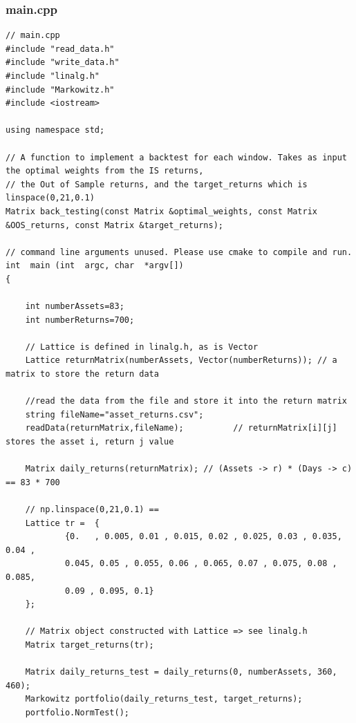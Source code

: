 \documentclass[12pt,twoside]{article}
\begin{document}
\subsubsection{main.cpp}
\scriptsize
\begin{verbatim}
// main.cpp
#include "read_data.h"
#include "write_data.h"
#include "linalg.h"
#include "Markowitz.h"
#include <iostream>

using namespace std;

// A function to implement a backtest for each window. Takes as input the optimal weights from the IS returns,
// the Out of Sample returns, and the target_returns which is linspace(0,21,0.1)
Matrix back_testing(const Matrix &optimal_weights, const Matrix &OOS_returns, const Matrix &target_returns);

// command line arguments unused. Please use cmake to compile and run.
int  main (int  argc, char  *argv[])
{

    int numberAssets=83;
    int numberReturns=700;

    // Lattice is defined in linalg.h, as is Vector
    Lattice returnMatrix(numberAssets, Vector(numberReturns)); // a matrix to store the return data

    //read the data from the file and store it into the return matrix
    string fileName="asset_returns.csv";
    readData(returnMatrix,fileName);          // returnMatrix[i][j] stores the asset i, return j value

    Matrix daily_returns(returnMatrix); // (Assets -> r) * (Days -> c) == 83 * 700

    // np.linspace(0,21,0.1) ==
    Lattice tr =  {
            {0.   , 0.005, 0.01 , 0.015, 0.02 , 0.025, 0.03 , 0.035, 0.04 ,
            0.045, 0.05 , 0.055, 0.06 , 0.065, 0.07 , 0.075, 0.08 , 0.085,
            0.09 , 0.095, 0.1}
    };

    // Matrix object constructed with Lattice => see linalg.h
    Matrix target_returns(tr);

    Matrix daily_returns_test = daily_returns(0, numberAssets, 360, 460);
    Markowitz portfolio(daily_returns_test, target_returns);
    portfolio.NormTest();


\end{verbatim}
\end{document}
